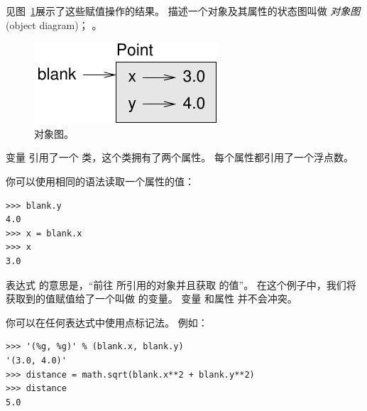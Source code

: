 见图~\ref{fig.point}展示了这些赋值操作的结果。  描述一个对象及其属性的状态图叫做 {\em 对象图} (object diagram)； 。

  
  

\begin{figure}
\centerline
{\includegraphics[scale=0.8]{../source/figs/point.pdf}}
\caption{对象图。}
\label{fig.point}
\end{figure}


变量  引用了一个  类，这个类拥有了两个属性。
每个属性都引用了一个浮点数。


你可以使用相同的语法读取一个属性的值：

\begin{lstlisting}
>>> blank.y
4.0
>>> x = blank.x
>>> x
3.0
\end{lstlisting}

%

表达式  的意思是，``前往  所引用的对象并且获取  的值''。
在这个例子中，我们将获取到的值赋值给了一个叫做  的变量。
变量  和属性  并不会冲突。


你可以在任何表达式中使用点标记法。 例如：

\begin{lstlisting}
>>> '(%g, %g)' % (blank.x, blank.y)
'(3.0, 4.0)'
>>> distance = math.sqrt(blank.x**2 + blank.y**2)
>>> distance
5.0
\end{lstlisting}

